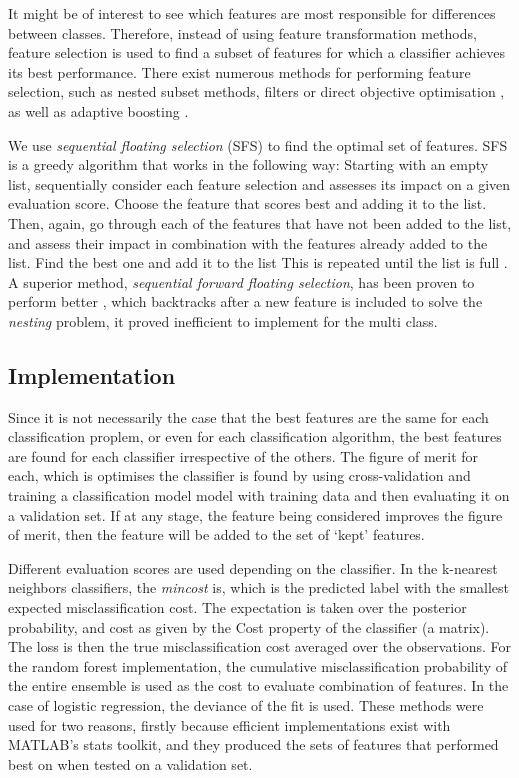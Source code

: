 It might be of interest to see which features are most responsible for differences between classes. Therefore, instead of using feature transformation methods, feature selection is used to find a subset of features for which a classifier achieves its best performance. There exist numerous methods for performing feature selection, such as nested subset methods, filters or direct objective optimisation \cite{Guyon}, as well as adaptive boosting \cite{Wang_2}.

We use \textit{sequential floating selection} (SFS) \cite{Somol} to find the optimal set of features. SFS is a greedy algorithm that works in the following way: Starting with an empty list, sequentially consider each feature selection and assesses its impact on a given evaluation score. Choose the feature that scores best and adding it to the list. Then, again, go through each of the features that have not been added to the list, and assess their impact in combination with the features already added to the list. Find the best one and add it to the list This is repeated until the list is full \cite{Juha}. A superior method, \textit{sequential forward floating selection}, has been proven to perform better \cite{Somol}, which backtracks after a new feature is included to solve the \textit{nesting} problem, it proved inefficient to implement for the multi class.

\subsection{Implementation}
Since it is not necessarily the case that the best features are the same for each classification proplem, or even for each classification algorithm, the best features are found for each classifier irrespective of the others. The figure of merit for each, which is optimises the classifier is found by using cross-validation and training a classification model model with training data and then evaluating it on a validation set. If at any stage, the feature being considered improves the figure of merit, then the feature will be added to the set of `kept' features.

Different evaluation scores are used depending on the classifier. In the k-nearest neighbors classifiers, the \textit{mincost} is, which is the predicted label with the smallest expected misclassification cost. The expectation is taken over the posterior probability, and cost as given by the Cost property of the classifier (a matrix). The loss is then the true misclassification cost averaged over the observations. For the random forest implementation, the cumulative misclassification probability of the entire ensemble is used as the cost to evaluate combination of features. In the case of logistic regression, the deviance of the fit is used. These methods were used for two reasons, firstly because efficient implementations exist with MATLAB's stats toolkit, and they produced the sets of features that performed best on when tested on a validation set.